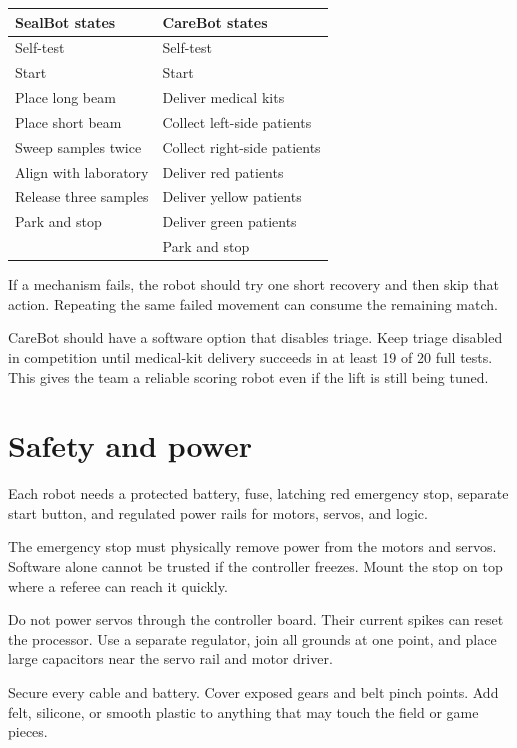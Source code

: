 \documentclass[11pt,a4paper]{article}
\begin{document}
\begin{center}
\begin{tabularx}{\textwidth}{XX}
\toprule
\textbf{SealBot states} & \textbf{CareBot states}\\
\midrule
Self-test & Self-test\\
Start & Start\\
Place long beam & Deliver medical kits\\
Place short beam & Collect left-side patients\\
Sweep samples twice & Collect right-side patients\\
Align with laboratory & Deliver red patients\\
Release three samples & Deliver yellow patients\\
Park and stop & Deliver green patients\\
 & Park and stop\\
\bottomrule
\end{tabularx}
\end{center}

If a mechanism fails, the robot should try one short recovery and then skip that action. Repeating the same failed movement can consume the remaining match.

CareBot should have a software option that disables triage. Keep triage disabled in competition until medical-kit delivery succeeds in at least 19 of 20 full tests. This gives the team a reliable scoring robot even if the lift is still being tuned.

\section{Safety and power}

Each robot needs a protected battery, fuse, latching red emergency stop, separate start button, and regulated power rails for motors, servos, and logic.

The emergency stop must physically remove power from the motors and servos. Software alone cannot be trusted if the controller freezes. Mount the stop on top where a referee can reach it quickly.

Do not power servos through the controller board. Their current spikes can reset the processor. Use a separate regulator, join all grounds at one point, and place large capacitors near the servo rail and motor driver.

Secure every cable and battery. Cover exposed gears and belt pinch points. Add felt, silicone, or smooth plastic to anything that may touch the field or game pieces.
\end{document}
